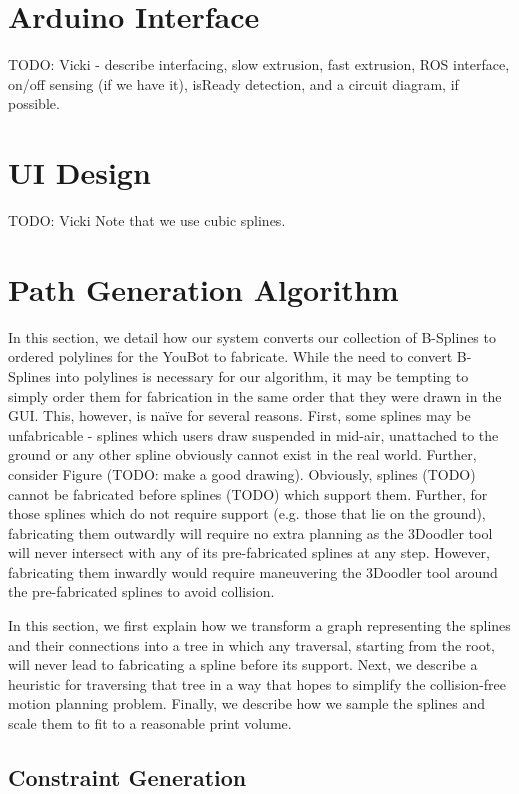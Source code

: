 \documentclass[conference]{acmsiggraph}
\begin{document}

\section{Arduino Interface}
TODO: Vicki - describe interfacing, slow extrusion, fast extrusion, ROS interface, on/off sensing (if we have it), isReady detection, and a circuit diagram, if possible.


\section{UI Design}
TODO: Vicki
Note that we use cubic splines.

\section{Path Generation Algorithm}
In this section, we detail how our system converts our collection of B-Splines to ordered polylines for the YouBot to fabricate.  While the need to convert B-Splines into polylines is necessary for our algorithm, it may be tempting to simply order them for fabrication in the same order that they were drawn in the GUI.  This, however, is naïve for several reasons.  First, some splines may be unfabricable - splines which users draw suspended in mid-air, unattached to the ground or any other spline obviously cannot exist in the real world.  Further, consider Figure (TODO: make a good drawing).  Obviously, splines (TODO) cannot be fabricated before splines (TODO) which support them.  Further, for those splines which do not require support (e.g. those that lie on the ground), fabricating them outwardly will require no extra planning as the 3Doodler tool will never intersect with any of its pre-fabricated splines at any step.  However, fabricating them inwardly would require maneuvering the 3Doodler tool around the pre-fabricated splines to avoid collision.

In this section, we first explain how we transform a graph representing the splines and their connections into a tree in which any traversal, starting from the root, will never lead to fabricating a spline before its support.  Next, we describe a heuristic for traversing that tree in a way that hopes to simplify the collision-free motion planning problem.  Finally, we describe how we sample the splines and scale them to fit to a reasonable print volume.

\subsection{Constraint Generation}
\end{document}

